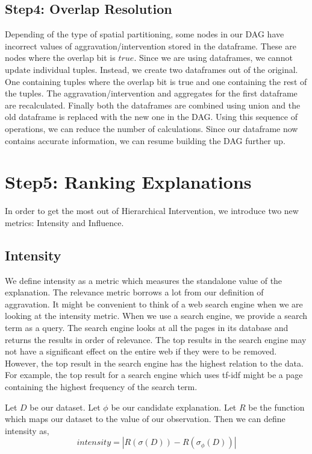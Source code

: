 \subsection{Step4: Overlap Resolution}
Depending of the type of spatial partitioning, some nodes in our DAG have incorrect values of aggravation/intervention stored in the dataframe. These are nodes where the overlap bit is $true$. Since we are using dataframes, we cannot update individual tuples. Instead, we create two dataframes out of the original. One containing tuples where the overlap bit is true and one containing the rest of the tuples. The aggravation/intervention and aggregates for the first dataframe are recalculated. Finally both the dataframes are combined using union and the old dataframe is replaced with the new one in the DAG. Using this sequence of operations, we can reduce the number of calculations. Since our dataframe now contains accurate information, we can resume building the DAG further up.

\section{Step5: Ranking Explanations}
\label{sec:extending_hi}

In order to get the most out of Hierarchical Intervention, we introduce two new metrics: Intensity and Influence.

\subsection{Intensity}
\label{sec:intensity}

We define intensity as a metric which measures the standalone value of the explanation. The relevance metric borrows a lot from our definition of aggravation. It might be convenient to think of a web search engine when we are looking at the intensity metric. When we use a search engine, we provide a search term as a query. The search engine looks at all the pages in its database and returns the results in order of relevance. The top results in the search engine may not have a significant effect on the entire web if they were to be removed. However, the top result in the search engine has the highest relation to the data. For example, the top result for a search engine which uses tf-idf might be a page containing the highest frequency of the search term\citep{robertson2004understanding}.

Let $D$ be our dataset. Let $\phi$ be our candidate explanation. Let $R$ be the function which maps our dataset to the value of our observation. Then we can define intensity as,
$$intensity = |R(\sigma (D)) - R(\sigma_\phi (D))|$$

